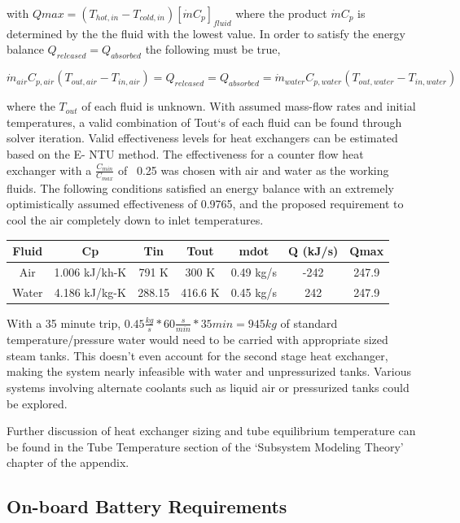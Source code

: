 \documentclass[heading.tex]{subfiles}
\begin{document}
with $Qmax=\left(T_{hot,in} - T_{cold,in}\right) [ \dot{m} C_{p} ]_{fluid}$ where the product $\dot{m} C_{p}$ is determined by the the fluid with the lowest
value. In order to satisfy the energy balance $Q_{released}=Q_{absorbed}$ the following must be true,

\begin{equation*}
\dot{m}_{air} C_{p, air} (T_{out, air} - T_{in, air}) = {Q}_{released} = {Q}_{absorbed}= \dot{m}_{water} C_{p,water} (T_{out, water} - T_{in, water})
\end{equation*}

where the $T_{out}$  of each fluid is unknown. With assumed mass-flow rates and initial temperatures, a valid combination of Tout‘s of
each fluid can be found through solver iteration. Valid effectiveness levels for heat exchangers can be estimated based on the E- NTU
method. The effectiveness for a counter flow heat exchanger with a $\frac{C_{min}}{C_{max}}$ of ~0.25 was chosen with air and water as the working fluids. 
The following conditions satisfied an energy balance with an extremely optimistically assumed effectiveness of 0.9765, and the proposed requirement to cool the
air completely down to inlet temperatures.

\begin{tabular}{|c|c|c|c|c|c|c|}
\hline 
Fluid & Cp & Tin & Tout & mdot & Q (kJ/s) & Qmax \\ 
\hline 
Air & 1.006 kJ/kh-K & 791 K & 300 K & 0.49 kg/s & -242 & 247.9 \\ 
\hline 
Water & 4.186 kJ/kg-K & 288.15 & 416.6 K  & 0.45 kg/s & 242 & 247.9 \\ 
\hline 
\end{tabular} 


With a 35 minute trip, $0.45 \frac{kg}{s} * 60 \frac{s}{min} * 35min = 945 kg$ of standard temperature/pressure water would need to be carried with appropriate
sized steam tanks. This doesn't even account for the second stage heat exchanger, making the system nearly infeasible with water and
unpressurized tanks. Various systems involving alternate coolants such as liquid air or pressurized tanks could be explored.

Further discussion of heat exchanger sizing and tube equilibrium temperature can be found in the Tube Temperature section of the
‘Subsystem Modeling Theory’ chapter of the appendix.

\subsection{On-board Battery Requirements}
\end{document}
